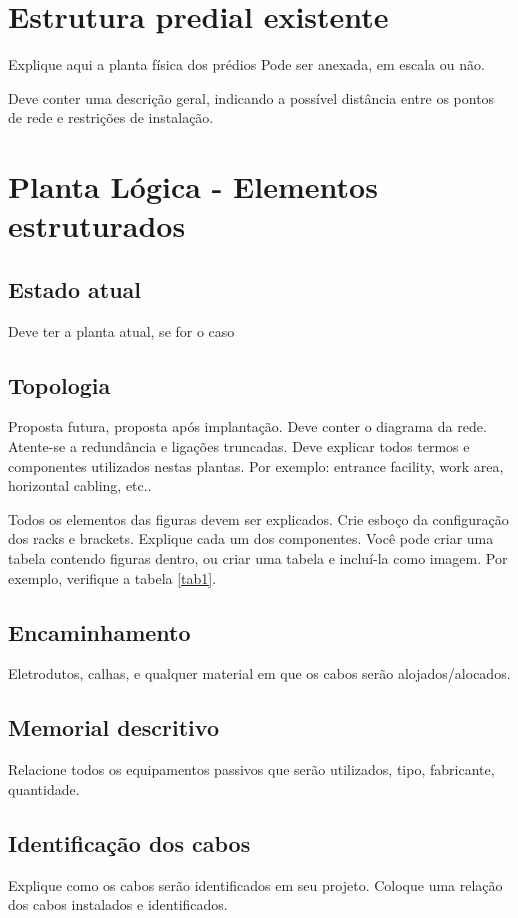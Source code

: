 \documentclass[	DIV=calc,%
							paper=a4,%
							fontsize=12pt,%
							onecolumn]{scrartcl}	 					%
\begin{document}
\section{Estrutura predial existente}

Explique aqui a planta física dos prédios
Pode ser anexada, em escala ou não.

Deve conter uma descrição geral, indicando a possível distância entre os pontos de rede e restrições de instalação.

\section{Planta Lógica - Elementos estruturados}

\subsection{Estado atual}
Deve ter a planta atual, se for o caso

\subsection{Topologia}
Proposta futura, proposta após implantação.
Deve conter o diagrama da rede. Atente-se a redundância  e ligações truncadas.
Deve explicar todos termos e componentes utilizados nestas plantas. Por exemplo: entrance facility, work area, horizontal cabling, etc..

Todos os elementos das figuras devem ser explicados. 
Crie esboço da configuração dos racks e brackets. Explique cada um dos componentes. Você pode criar uma tabela contendo figuras dentro, ou criar uma tabela e incluí-la como imagem. Por exemplo, verifique a tabela \ref{tab1}.



\subsection{Encaminhamento}
Eletrodutos, calhas, e qualquer material em que os cabos serão alojados/alocados.

\subsection{Memorial descritivo}

Relacione todos os equipamentos passivos que serão utilizados, tipo, fabricante, quantidade.

\subsection{Identificação dos cabos}
Explique como os cabos serão identificados em seu projeto. Coloque uma relação dos cabos instalados e identificados.
\end{document}
